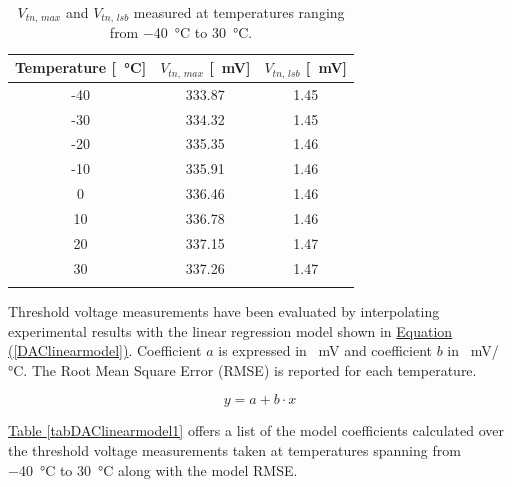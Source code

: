 \begin{table}[ht]
    \centering
    \begin{tabular}{c c c} 
        \Xhline{2\arrayrulewidth}
        Temperature [\SI{}{\celsius}] & $V_{\textit{tn, max}}$ [\SI{}{\milli\volt}] & $V_{\textit{tn, lsb}}$ [\SI{}{\milli\volt}] \T\B \\
        \hline
        -40 & 333.87 & 1.45 \T\B \\
        -30 & 334.32 & 1.45 \T\B \\
        -20 & 335.35 & 1.46 \T\B \\
        -10 & 335.91 & 1.46 \T\B \\
        0 & 336.46 & 1.46 \T\B \\
        10 & 336.78 & 1.46 \T\B \\
        20 & 337.15 & 1.47 \T\B \\
        30 & 337.26 & 1.47 \T\B \\
        \Xhline{2\arrayrulewidth}
    \end{tabular}
    \caption{$V_{\textit{tn, max}}$ and $V_{\textit{tn, lsb}}$ measured at temperatures ranging from \SI{-40}{\celsius} to \SI{30}{\celsius}.}
    \label{tabDACmaxlsb}
\end{table}

\par
Threshold voltage measurements have been evaluated by interpolating experimental results with the linear regression model shown in \hyperref[DAClinearmodel]{Equation (\ref{DAClinearmodel})}. Coefficient $a$ is expressed in \SI{}{\milli\volt} and coefficient $b$ in \SI{}{\milli\volt/\celsius}. The Root Mean Square Error (RMSE) is reported for each temperature.

\begin{equation}
    y = a + b \cdot x
\label{DAClinearmodel}
\end{equation}

\hyperref[tabDAClinearmodel1]{Table \ref{tabDAClinearmodel1}} offers a list of the model coefficients calculated over the threshold voltage measurements taken at temperatures spanning from \SI{-40}{\celsius} to \SI{30}{\celsius} along with the model RMSE.


